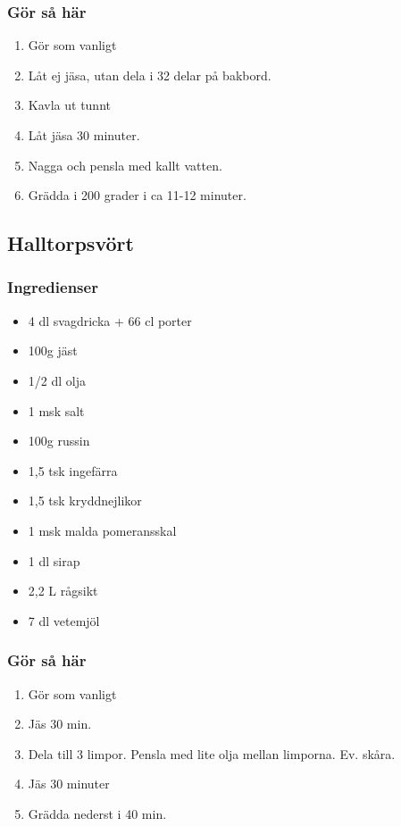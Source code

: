 \documentclass[a4paper,11pt,twocolumn]{article}
\begin{document}
\subsubsection*{Gör så här}
\begin{enumerate}[label=\arabic*.]
    \item Gör som vanligt
    \item Låt ej jäsa, utan dela i 32 delar på bakbord.
    \item Kavla ut tunnt
    \item Låt jäsa 30 minuter.
    \item Nagga och pensla med kallt vatten.
    \item Grädda i 200 grader i ca 11-12 minuter.
\end{enumerate}



\subsection{Halltorpsvört}
\subsubsection*{Ingredienser}
\begin{itemize}[noitemsep]
    \item 4 dl svagdricka + 66 cl porter
    \item 100g jäst
    \item 1/2 dl olja
    \item 1 msk salt
    \item 100g russin
    \item 1,5 tsk ingefärra
    \item 1,5 tsk kryddnejlikor
    \item 1 msk malda pomeransskal
    \item 1 dl sirap
    \item 2,2 L rågsikt
    \item 7 dl vetemjöl
\end{itemize}
\subsubsection*{Gör så här}
\begin{enumerate}[label=\arabic*.]
    \item Gör som vanligt
    \item Jäs 30 min.
    \item Dela till 3 limpor. Pensla med lite olja mellan limporna. Ev. skåra.
    \item Jäs 30 minuter
    \item Grädda nederst i 40 min.
\end{enumerate}
\end{document}
